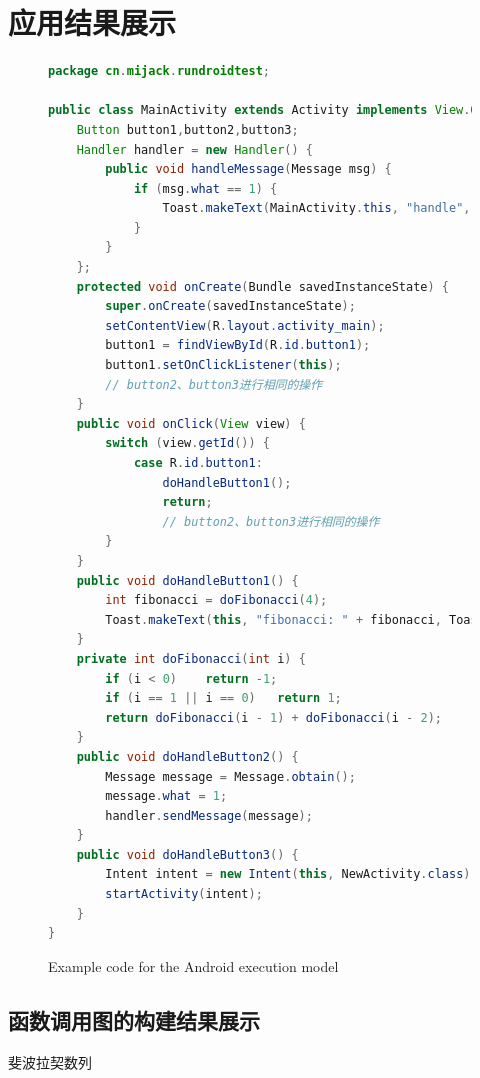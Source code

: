\chapter{应用结果展示}  
\label{chp:display}

\begin{figure}
	\centering
	\begin{lstlisting}[language=Java]
package cn.mijack.rundroidtest;

public class MainActivity extends Activity implements View.OnClickListener {
	Button button1,button2,button3;
	Handler handler = new Handler() {
		public void handleMessage(Message msg) {
			if (msg.what == 1) {
				Toast.makeText(MainActivity.this, "handle", Toast.LENGTH_SHORT).show();
			}
		}
	};
	protected void onCreate(Bundle savedInstanceState) {
		super.onCreate(savedInstanceState);
		setContentView(R.layout.activity_main);
		button1 = findViewById(R.id.button1);
		button1.setOnClickListener(this);
		// button2、button3进行相同的操作
	}
	public void onClick(View view) {
		switch (view.getId()) {
			case R.id.button1:
				doHandleButton1();
				return;
				// button2、button3进行相同的操作
		}
	}
	public void doHandleButton1() {
		int fibonacci = doFibonacci(4);
		Toast.makeText(this, "fibonacci: " + fibonacci, Toast.LENGTH_SHORT).show();
	}
	private int doFibonacci(int i) {
		if (i < 0)    return -1;   
		if (i == 1 || i == 0)   return 1; 
		return doFibonacci(i - 1) + doFibonacci(i - 2);
	}
	public void doHandleButton2() {
		Message message = Message.obtain();
		message.what = 1;
		handler.sendMessage(message);
	}
	public void doHandleButton3() {
		Intent intent = new Intent(this, NewActivity.class);
		startActivity(intent);
	}
}\end{lstlisting}
	\caption{Example code for the Android execution model}
	\label{fig:code_demo}
\end{figure}

\section{函数调用图的构建结果展示}

斐波拉契数列


